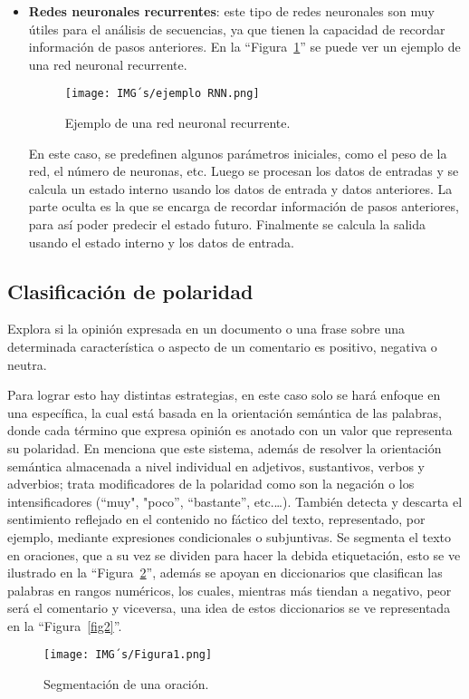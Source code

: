 \documentclass[12pt, conference]{IEEEtran}
\begin{document}
\begin{itemize}
  \item \textbf{Redes neuronales recurrentes}: este tipo de redes neuronales son muy útiles para el análisis de secuencias, ya que tienen la capacidad de recordar información de pasos anteriores. En la ``Figura~\ref{fig13}'' se puede ver un ejemplo de una red neuronal recurrente.
  \begin{figure}
    \caption{Ejemplo de una red neuronal recurrente.}
    \centerline{\texttt{[image: IMG´s/ejemplo RNN.png]}}
    \label{fig13}
  \end{figure}
  En este caso, se predefinen algunos parámetros iniciales, como el peso de la red, el número de neuronas, etc. Luego se procesan los datos de entradas y se calcula un estado interno usando los datos de entrada y datos anteriores. La parte oculta es la que se encarga de recordar información de pasos anteriores, para así poder predecir el estado futuro. Finalmente se calcula la salida usando el estado interno y los datos de entrada.
\end{itemize}

\subsection{Clasificación de polaridad}
Explora si la opinión expresada en un documento o una frase sobre una determinada característica o aspecto de un comentario es positivo, negativa o neutra. 

  Para lograr esto hay distintas estrategias, en este caso solo se hará enfoque en una específica, la cual está basada en la orientación semántica de las palabras, donde cada término que expresa opinión es anotado con un valor que representa su polaridad. En \cite{f1} menciona que este sistema, además de resolver la orientación semántica almacenada a nivel individual en adjetivos, sustantivos, verbos y adverbios; trata modificadores de la polaridad como son la negación o los intensificadores (“muy", "poco”, “bastante”, etc.…). También detecta y descarta el sentimiento reflejado en el contenido no fáctico del texto, representado, por ejemplo, mediante expresiones condicionales o subjuntivas.
Se segmenta el texto en oraciones, que a su vez se dividen para hacer la debida etiquetación, esto se ve ilustrado en la ``Figura~\ref{fig1}'', además se apoyan en diccionarios que clasifican las palabras en rangos numéricos, los cuales, mientras más tiendan a negativo, peor será el comentario y viceversa, una idea de estos diccionarios se ve representada en la ``Figura~\ref{fig2}''.
  \begin{figure}[htbp]
    \caption{Segmentación de una oración.}
    \centerline{\texttt{[image: IMG´s/Figura1.png]}}
    \label{fig1}
  \end{figure}
  
\end{document}

